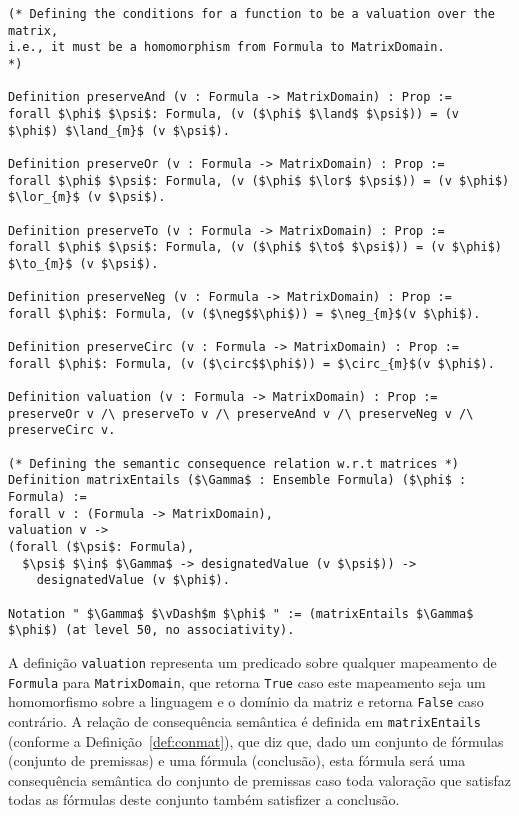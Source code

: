       \begin{lstlisting}[name=Semantics, frame=single, language=coq]
(* Defining the conditions for a function to be a valuation over the matrix,
i.e., it must be a homomorphism from Formula to MatrixDomain.
*)

Definition preserveAnd (v : Formula -> MatrixDomain) : Prop := 
forall $\phi$ $\psi$: Formula, (v ($\phi$ $\land$ $\psi$)) = (v $\phi$) $\land_{m}$ (v $\psi$).

Definition preserveOr (v : Formula -> MatrixDomain) : Prop := 
forall $\phi$ $\psi$: Formula, (v ($\phi$ $\lor$ $\psi$)) = (v $\phi$) $\lor_{m}$ (v $\psi$).

Definition preserveTo (v : Formula -> MatrixDomain) : Prop := 
forall $\phi$ $\psi$: Formula, (v ($\phi$ $\to$ $\psi$)) = (v $\phi$) $\to_{m}$ (v $\psi$).

Definition preserveNeg (v : Formula -> MatrixDomain) : Prop := 
forall $\phi$: Formula, (v ($\neg$$\phi$)) = $\neg_{m}$(v $\phi$).

Definition preserveCirc (v : Formula -> MatrixDomain) : Prop := 
forall $\phi$: Formula, (v ($\circ$$\phi$)) = $\circ_{m}$(v $\phi$).

Definition valuation (v : Formula -> MatrixDomain) : Prop :=
preserveOr v /\ preserveTo v /\ preserveAnd v /\ preserveNeg v /\ preserveCirc v.

(* Defining the semantic consequence relation w.r.t matrices *)
Definition matrixEntails ($\Gamma$ : Ensemble Formula) ($\phi$ : Formula) := 
forall v : (Formula -> MatrixDomain),
valuation v -> 
(forall ($\psi$: Formula), 
  $\psi$ $\in$ $\Gamma$ -> designatedValue (v $\psi$)) -> 
    designatedValue (v $\phi$).

Notation " $\Gamma$ $\vDash$m $\phi$ " := (matrixEntails $\Gamma$ $\phi$) (at level 50, no associativity).
      \end{lstlisting}

      A definição \texttt{valuation} representa um predicado sobre qualquer mapeamento de \texttt{Formula} para \texttt{MatrixDomain}, que retorna \texttt{True} caso este mapeamento seja um homomorfismo sobre a linguagem e o domínio da matriz e retorna \texttt{False} caso contrário. A relação de consequência semântica é definida em \texttt{matrixEntails} (conforme a Definição~\ref{def:conmat}), que diz que, dado um conjunto de fórmulas (conjunto de premissas) e uma fórmula (conclusão), esta fórmula será uma consequência semântica do conjunto de premissas caso toda valoração que satisfaz todas as fórmulas deste conjunto também satisfizer a conclusão.

